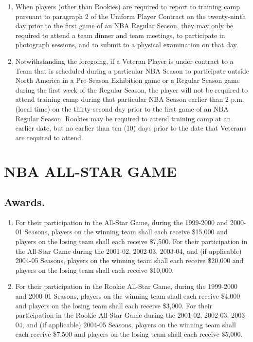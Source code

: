 \documentclass[
]{book}
\providecommand{\tightlist}{%
  \setlength{\itemsep}{0pt}\setlength{\parskip}{0pt}}
\begin{document}
\begin{enumerate}
\def\labelenumi{(\alph{enumi})}
\tightlist
\item
  When players (other than Rookies) are required to report to training camp pursuant to paragraph 2 of the Uniform Player Contract on the twenty-ninth day prior to the first game of an NBA Regular Season, they may only be required to attend a team dinner and team meetings, to participate in photograph sessions, and to submit to a physical examination on that day.
\item
  Notwithstanding the foregoing, if a Veteran Player is under contract to a Team that is scheduled during a particular NBA Season to participate outside North America in a Pre-Season Exhibition game or a Regular Season game during the first week of the Regular Season, the player will not be required to attend training camp during that particular NBA Season earlier than 2 p.m. (local time) on the thirty-second day prior to the first game of an NBA Regular Season. Rookies may be required to attend training camp at an earlier date, but no earlier than ten (10) days prior to the date that Veterans are required to attend.
\end{enumerate}

\hypertarget{nba-all-star-game}{%
\chapter{NBA ALL-STAR GAME}\label{nba-all-star-game}}

\hypertarget{awards.}{%
\section{Awards.}\label{awards.}}

\begin{enumerate}
\def\labelenumi{(\alph{enumi})}
\tightlist
\item
  For their participation in the All-Star Game, during the 1999-2000 and 2000-01 Seasons, players on the winning team shall each receive \$15,000 and players on the losing team shall each receive \$7,500. For their participation in the All-Star Game during the 2001-02, 2002-03, 2003-04, and (if applicable) 2004-05 Seasons, players on the winning team shall each receive \$20,000 and players on the losing team shall each receive \$10,000.
\item
  For their participation in the Rookie All-Star Game, during the 1999-2000 and 2000-01 Seasons, players on the winning team shall each receive \$4,000 and players on the losing team shall each receive \$3,000. For their participation in the Rookie All-Star Game during the 2001-02, 2002-03, 2003-04, and (if applicable) 2004-05 Seasons, players on the winning team shall each receive \$7,500 and players on the losing team shall each receive \$5,000.
\end{enumerate}
\end{document}
